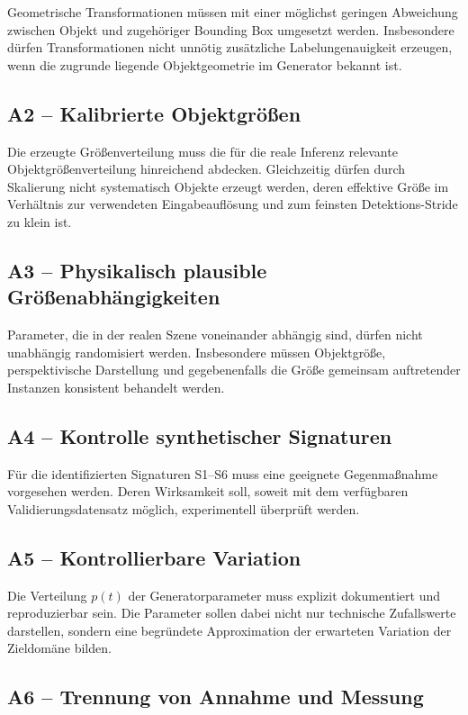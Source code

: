 Geometrische Transformationen müssen mit einer möglichst geringen Abweichung zwischen Objekt und zugehöriger Bounding Box umgesetzt werden. Insbesondere dürfen Transformationen nicht unnötig zusätzliche Labelungenauigkeit erzeugen, wenn die zugrunde liegende Objektgeometrie im Generator bekannt ist.

\subsection*{A2 -- Kalibrierte Objektgrößen}

Die erzeugte Größenverteilung muss die für die reale Inferenz relevante Objektgrößenverteilung hinreichend abdecken. Gleichzeitig dürfen durch Skalierung nicht systematisch Objekte erzeugt werden, deren effektive Größe im Verhältnis zur verwendeten Eingabeauflösung und zum feinsten Detektions-Stride zu klein ist.

\subsection*{A3 -- Physikalisch plausible Größenabhängigkeiten}

Parameter, die in der realen Szene voneinander abhängig sind, dürfen nicht unabhängig randomisiert werden. Insbesondere müssen Objektgröße, perspektivische Darstellung und gegebenenfalls die Größe gemeinsam auftretender Instanzen konsistent behandelt werden.

\subsection*{A4 -- Kontrolle synthetischer Signaturen}

Für die identifizierten Signaturen S1--S6 muss eine geeignete Gegenmaßnahme vorgesehen werden. Deren Wirksamkeit soll, soweit mit dem verfügbaren Validierungsdatensatz möglich, experimentell überprüft werden.

\subsection*{A5 -- Kontrollierbare Variation}

Die Verteilung $p(t)$ der Generatorparameter muss explizit dokumentiert und reproduzierbar sein. Die Parameter sollen dabei nicht nur technische Zufallswerte darstellen, sondern eine begründete Approximation der erwarteten Variation der Zieldomäne bilden.

\subsection*{A6 -- Trennung von Annahme und Messung}

